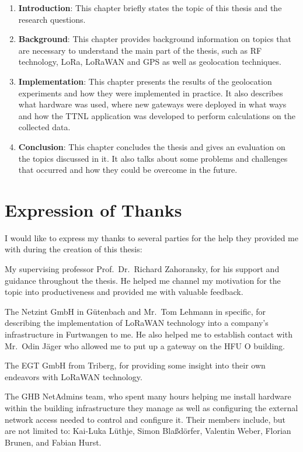 \begin{enumerate}
      \item \textbf{Introduction}:
            This chapter briefly states the topic of this thesis and the research questions.
      \item \textbf{Background}:
            This chapter provides background information on topics that are necessary to understand the main part of the thesis, such as \ac{RF} technology, \ac{LoRa}, \ac{LoRaWAN} and \ac{GPS} as well as geolocation techniques.
      \item \textbf{Implementation}:
            This chapter presents the results of the geolocation experiments and how they were implemented in practice.
            It also describes what hardware was used, where new gateways were deployed in what ways and how the \ac{TTNL} application was developed to perform calculations on the collected data.
      \item \textbf{Conclusion}:
            This chapter concludes the thesis and gives an evaluation on the topics discussed in it.
            It also talks about some problems and challenges that occurred and how they could be overcome in the future.
\end{enumerate}


\section{Expression of Thanks}

I would like to express my thanks to several parties for the help they provided me with during the creation of this thesis:

My supervising professor Prof.\ Dr.\ Richard Zahoransky, for his support and guidance throughout the thesis.
He helped me channel my motivation for the topic into productiveness and provided me with valuable feedback.

The Netzint GmbH in Gütenbach and Mr.\ Tom Lehmann in specific, for describing the implementation of \ac{LoRaWAN} technology into a company's infrastructure in Furtwangen to me.
He also helped me to establish contact with Mr.\ Odin Jäger who allowed me to put up a gateway on the \ac{HFU} O building.

The EGT GmbH from Triberg, for providing some insight into their own endeavors with \ac{LoRaWAN} technology.

The \ac{GHB} NetAdmins team, who spent many hours helping me install hardware within the building infrastructure they manage as well as configuring the external network access needed to control and configure it.
Their members include, but are not limited to: Kai-Luka Lüthje, Simon Blaßdörfer, Valentin Weber, Florian Brunen, and Fabian Hurst.

